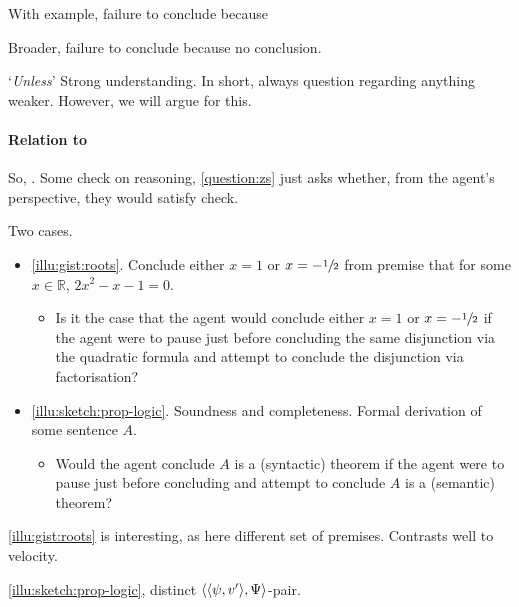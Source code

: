 \begin{note}
  With example, failure to conclude because 


  Broader, failure to conclude because no conclusion.

  `\emph{Unless}'
  {
    \color{red}
    Strong understanding.
    In short, always question regarding anything weaker.
    However, we will argue for this.
  }
\end{note}

\paragraph{Relation to }

\begin{note}[\cScen{1}]
  So, .
  Some check on reasoning, \autoref{question:zs} just asks whether, from the agent's perspective, they would satisfy check.

  Two cases.

  \begin{itemize}
  \item
    \autoref{illu:gist:roots}.
    Conclude either \(x = 1\) or \(x = -\sfrac{1}{2}\) from premise that for some \(x \in \mathbb{R}\), \(2x^{2} - x - 1 = 0\).
    \begin{itemize}
    \item
      Is it the case that the agent would conclude either \(x = 1\) or \(x = -\sfrac{1}{2}\) if the agent were to pause just before concluding the same disjunction via the quadratic formula and attempt to conclude the disjunction via factorisation?
    \end{itemize}
  \item
    \autoref{illu:sketch:prop-logic}.
    Soundness and completeness.
    Formal derivation of some sentence \(A\).
    \begin{itemize}
    \item
      Would the agent conclude \(A\) is a (syntactic) theorem if the agent were to pause just before concluding and attempt to conclude \(A\) is a (semantic) theorem?
    \end{itemize}
  \end{itemize}

  \autoref{illu:gist:roots} is interesting, as here different set of premises.
  Contrasts well to velocity.

  \autoref{illu:sketch:prop-logic}, distinct \(\langle \langle \psi, v' \rangle, \Psi \rangle\)-pair.
  
\end{note}

